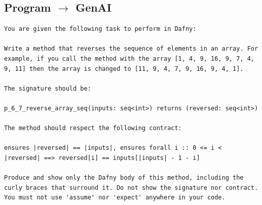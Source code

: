 \documentclass{article}
\begin{document}
\subsection*{Program $\rightarrow$ GenAI}
\begin{lstlisting}
You are given the following task to perform in Dafny:

Write a method that reverses the sequence of elements in an array. For example, if you call the method with the array [1, 4, 9, 16, 9, 7, 4, 9, 11] then the array is changed to [11, 9, 4, 7, 9, 16, 9, 4, 1].

The signature should be:

p_6_7_reverse_array_seq(inputs: seq<int>) returns (reversed: seq<int>)

The method should respect the following contract:

ensures |reversed| == |inputs|, ensures forall i :: 0 <= i < |reversed| ==> reversed[i] == inputs[|inputs| - 1 - i]

Produce and show only the Dafny body of this method, including the curly braces that surround it. Do not show the signature nor contract. You must not use 'assume' nor 'expect' anywhere in your code.
\end{lstlisting}
\end{document}
